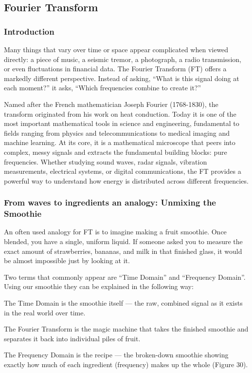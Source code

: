 \subsection{Fourier Transform}
\subsubsection{Introduction}

Many things that vary over time or space appear complicated when viewed directly: a piece of music, a seismic tremor, a photograph, a radio transmission, or even fluctuations in financial data. The Fourier Transform (FT) offers a markedly different perspective. Instead of asking, “What is this signal doing at each moment?” it asks, “Which frequencies combine to create it?”

Named after the French mathematician Joseph Fourier (1768-1830), the transform originated from his work on heat conduction. Today it is one of the most important mathematical tools in science and engineering, fundamental to fields ranging from physics and telecommunications to medical imaging and machine learning. At its core, it is a mathematical microscope that peers into complex, messy signals and extracts the fundamental building blocks: pure frequencies. Whether studying sound waves, radar signals, vibration measurements, electrical systems, or digital communications, the FT provides a powerful way to understand how energy is distributed across different frequencies.

\subsubsection{From waves to ingredients an analogy: Unmixing the Smoothie}

An often used analogy for FT is to imagine making a fruit smoothie. Once blended, you have a single, uniform liquid. If someone asked you to measure the exact amount of strawberries, bananas, and milk in that finished glass, it would be almost impossible just by looking at it.

Two terms that commonly appear are \enquote{Time Domain} and \enquote{Frequency Domain}. Using our smoothie they can be explained in the following way:

\begin{compactitem}
    \item The Time Domain is the smoothie itself — the raw, combined signal as it exists in the real world over time.
    \item The Fourier Transform is the magic machine that takes the finished smoothie and separates it back into individual piles of fruit.
    \item The Frequency Domain is the recipe — the broken-down smoothie showing exactly how much of each ingredient (frequency) makes up the whole (Figure 30).
\end{compactitem}

